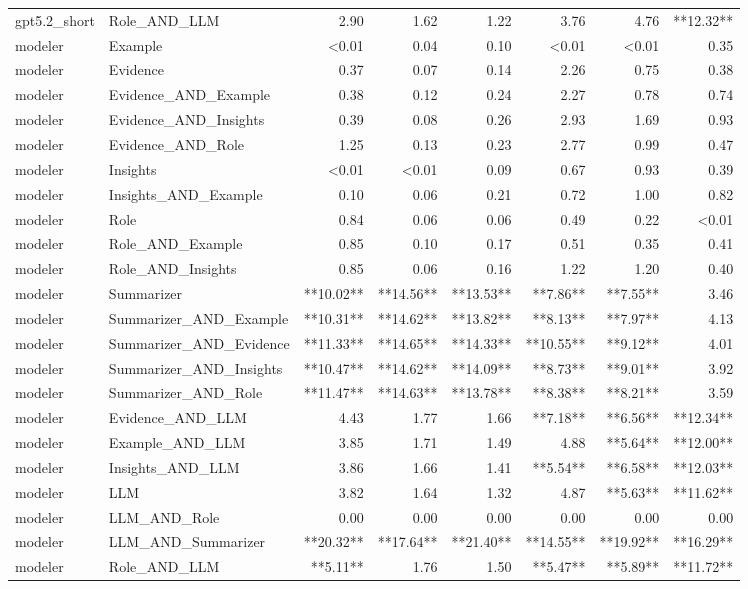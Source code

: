 \begin{tabular}{llrrrrrr}
gpt5.2_short & Role_AND_LLM & 2.90 & 1.62 & 1.22 & 3.76 & 4.76 & **12.32** \\
modeler & Example & <0.01 & 0.04 & 0.10 & <0.01 & <0.01 & 0.35 \\
modeler & Evidence & 0.37 & 0.07 & 0.14 & 2.26 & 0.75 & 0.38 \\
modeler & Evidence_AND_Example & 0.38 & 0.12 & 0.24 & 2.27 & 0.78 & 0.74 \\
modeler & Evidence_AND_Insights & 0.39 & 0.08 & 0.26 & 2.93 & 1.69 & 0.93 \\
modeler & Evidence_AND_Role & 1.25 & 0.13 & 0.23 & 2.77 & 0.99 & 0.47 \\
modeler & Insights & <0.01 & <0.01 & 0.09 & 0.67 & 0.93 & 0.39 \\
modeler & Insights_AND_Example & 0.10 & 0.06 & 0.21 & 0.72 & 1.00 & 0.82 \\
modeler & Role & 0.84 & 0.06 & 0.06 & 0.49 & 0.22 & <0.01 \\
modeler & Role_AND_Example & 0.85 & 0.10 & 0.17 & 0.51 & 0.35 & 0.41 \\
modeler & Role_AND_Insights & 0.85 & 0.06 & 0.16 & 1.22 & 1.20 & 0.40 \\
modeler & Summarizer & **10.02** & **14.56** & **13.53** & **7.86** & **7.55** & 3.46 \\
modeler & Summarizer_AND_Example & **10.31** & **14.62** & **13.82** & **8.13** & **7.97** & 4.13 \\
modeler & Summarizer_AND_Evidence & **11.33** & **14.65** & **14.33** & **10.55** & **9.12** & 4.01 \\
modeler & Summarizer_AND_Insights & **10.47** & **14.62** & **14.09** & **8.73** & **9.01** & 3.92 \\
modeler & Summarizer_AND_Role & **11.47** & **14.63** & **13.78** & **8.38** & **8.21** & 3.59 \\
modeler & Evidence_AND_LLM & 4.43 & 1.77 & 1.66 & **7.18** & **6.56** & **12.34** \\
modeler & Example_AND_LLM & 3.85 & 1.71 & 1.49 & 4.88 & **5.64** & **12.00** \\
modeler & Insights_AND_LLM & 3.86 & 1.66 & 1.41 & **5.54** & **6.58** & **12.03** \\
modeler & LLM & 3.82 & 1.64 & 1.32 & 4.87 & **5.63** & **11.62** \\
modeler & LLM_AND_Role & 0.00 & 0.00 & 0.00 & 0.00 & 0.00 & 0.00 \\
modeler & LLM_AND_Summarizer & **20.32** & **17.64** & **21.40** & **14.55** & **19.92** & **16.29** \\
modeler & Role_AND_LLM & **5.11** & 1.76 & 1.50 & **5.47** & **5.89** & **11.72** \\
\bottomrule
\end{tabular}
